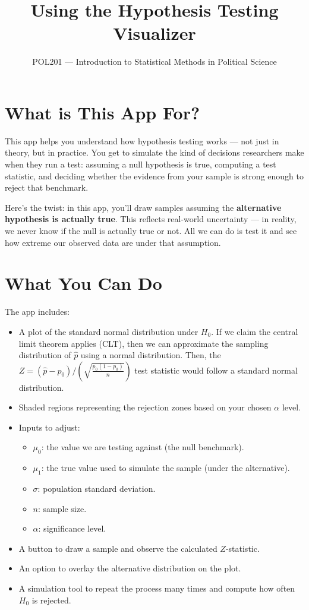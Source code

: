 \documentclass[11pt]{article}
\title{Using the Hypothesis Testing Visualizer}
\author{POL201 --- Introduction to Statistical Methods in Political Science}
\date{}
\begin{document}
\maketitle

\section*{What is This App For?}

This app helps you understand how hypothesis testing works --- not just in theory, but in practice. You get to simulate the kind of decisions researchers make when they run a test: assuming a null hypothesis is true, computing a test statistic, and deciding whether the evidence from your sample is strong enough to reject that benchmark.

Here’s the twist: in this app, you’ll draw samples assuming the \textbf{alternative hypothesis is actually true}. This reflects real-world uncertainty — in reality, we never know if the null is actually true or not. All we can do is test it and see how extreme our observed data are under that assumption.

\section*{What You Can Do}

The app includes:
\begin{itemize}
  \item A plot of the standard normal distribution under $H_0$. If we claim the central limit theorem applies (CLT), then we can approximate the sampling distribution of $\hat{p}$ using a normal distribution. Then, the $Z=\left(\hat{p}-p_0\right)/\left(\sqrt{\frac{p_0 (1-p_0)}{n}}\right)$ test statistic would follow a standard normal distribution.
  \item Shaded regions representing the rejection zones based on your chosen $\alpha$ level.
  \item Inputs to adjust:
  \begin{itemize}
    \item $\mu_0$: the value we are testing against (the null benchmark).
    \item $\mu_1$: the true value used to simulate the sample (under the alternative).
    \item $\sigma$: population standard deviation.
    \item $n$: sample size.
    \item $\alpha$: significance level.
  \end{itemize}
  \item A button to draw a sample and observe the calculated $Z$-statistic.
  \item An option to overlay the alternative distribution on the plot.
  \item A simulation tool to repeat the process many times and compute how often $H_0$ is rejected.
\end{itemize}
\end{document}
